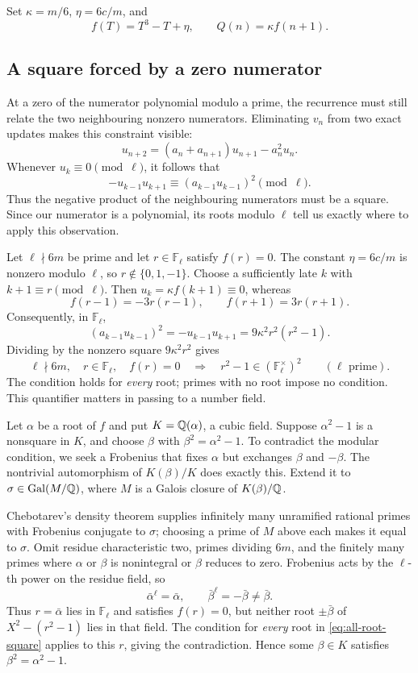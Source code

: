 \documentclass[11pt]{article}
\begin{document}
Set $\kappa=m/6$, $\eta=6c/m$, and
\[
 f(T)=T^3-T+\eta,\qquad Q(n)=\kappa f(n+1).
\]
\subsection{A square forced by a zero numerator}\label{sec:cubic-field}
At a zero of the numerator polynomial modulo a prime, the recurrence
must still relate the two neighbouring nonzero numerators. Eliminating
$v_n$ from two exact updates makes this constraint visible:
\begin{equation}\label{eq:three-tail}
 u_{n+2}=(a_n+a_{n+1})u_{n+1}-a_n^2u_n.
\end{equation}
Whenever $u_k\equiv0\pmod\ell$, it follows that
\[
 -u_{k-1}u_{k+1}\equiv(a_{k-1}u_{k-1})^2\pmod\ell.
\]
Thus the negative product of the neighbouring numerators must be a
square. Since our numerator is a polynomial, its roots modulo $\ell$
tell us exactly where to apply this observation.

Let $\ell\nmid6m$ be prime and let $r\in\mathbb F_\ell$ satisfy
$f(r)=0$. The constant $\eta=6c/m$ is nonzero modulo $\ell$, so
$r\notin\{0,1,-1\}$. Choose a sufficiently late $k$ with
$k+1\equiv r\pmod\ell$. Then $u_k=\kappa f(k+1)\equiv0$, whereas
\[
 f(r-1)=-3r(r-1),\qquad f(r+1)=3r(r+1).
\]
Consequently, in $\mathbb F_\ell$,
\[
 (a_{k-1}u_{k-1})^2=-u_{k-1}u_{k+1}
   =9\kappa^2r^2(r^2-1).
\]
Dividing by the nonzero square $9\kappa^2r^2$ gives
\begin{equation}\label{eq:all-root-square}
 \ell\nmid6m,\quad r\in\mathbb F_\ell,\quad f(r)=0
 \quad\Longrightarrow\quad r^2-1\in(\mathbb F_\ell^\times)^2
 \qquad(\ell\text{ prime}).
\end{equation}
The condition holds for \emph{every} root; primes with no root impose
no condition. This quantifier matters in passing to a number field.

Let $\alpha$ be a root of $f$ and put $K=\mathbb{Q}(\alpha)$, a cubic field.
Suppose $\alpha^2-1$ is a nonsquare in $K$, and choose $\beta$ with
$\beta^2=\alpha^2-1$. To contradict the modular condition, we seek a
Frobenius that fixes $\alpha$ but exchanges $\beta$ and $-\beta$.
The nontrivial automorphism of $K(\beta)/K$ does exactly this. Extend
it to $\sigma\in\operatorname{Gal}(M/\mathbb{Q})$, where $M$ is a Galois
closure of $K(\beta)/\mathbb{Q}$.

Chebotarev's density theorem
\cite[\S3, author-version p.~15]{stevenhagenlenstra1996} supplies
infinitely many unramified rational primes with Frobenius conjugate
to $\sigma$; choosing a prime of $M$ above each makes it equal to
$\sigma$. Omit residue characteristic two, primes dividing $6m$, and
the finitely many primes where $\alpha$ or $\beta$ is nonintegral or
$\beta$ reduces to zero. Frobenius acts by the $\ell$-th power on the
residue field, so
\[
 \bar\alpha^\ell=\bar\alpha,\qquad
 \bar\beta^\ell=-\bar\beta\ne\bar\beta.
\]
Thus $r=\bar\alpha$ lies in $\mathbb F_\ell$ and satisfies $f(r)=0$,
but neither root $\pm\bar\beta$ of $X^2-(r^2-1)$ lies in that field.
The condition for \emph{every} root in \eqref{eq:all-root-square}
applies to this $r$, giving the contradiction. Hence some $\beta\in K$
satisfies $\beta^2=\alpha^2-1$.
\end{document}
